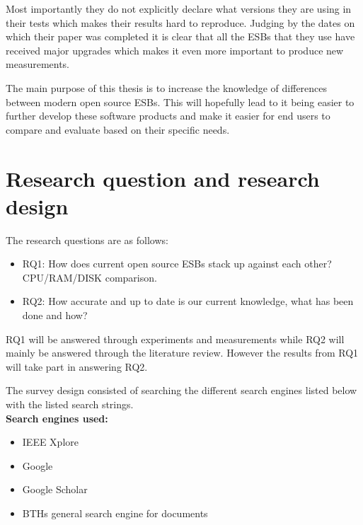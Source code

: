 \documentclass{llncs}
\begin{document}
Most importantly they do not explicitly declare what versions they are using in their tests which makes their results hard to reproduce. 
Judging by the dates on which their paper was completed it is clear that all the ESBs that they use have received major upgrades which makes it even more important to produce new measurements.

The main purpose of this thesis is to increase the knowledge of differences between modern open source ESBs. 
This will hopefully lead to it being easier to further develop these software products and make it easier for end users to compare and evaluate based on their specific needs.


\section{Research question and research design}
The research questions are as follows:
\begin{itemize}
	\item RQ1: How does current open source ESBs stack up against each other? CPU/RAM/DISK comparison.
	\item RQ2: How accurate and up to date is our current knowledge, what has been done and how?
\end{itemize}
RQ1 will be answered through experiments and measurements while RQ2 will mainly be answered through the literature review. However the results from RQ1 will take part in answering RQ2.

The survey design consisted of searching the different search engines listed below with the listed search strings. \\

{\bf Search engines used:}
\begin{itemize}
	\item IEEE Xplore
	\item Google
	\item Google Scholar
	\item BTHs general search engine for documents
\end{itemize}
\end{document}
